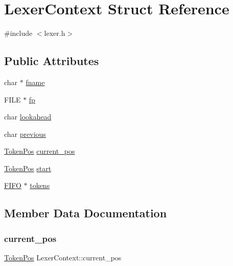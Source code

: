 \hypertarget{structLexerContext}{}\section{Lexer\+Context Struct Reference}
\label{structLexerContext}


{\ttfamily \#include $<$lexer.\+h$>$}

\subsection*{Public Attributes}
\begin{DoxyCompactItemize}
\item 
char $\ast$ \hyperlink{structLexerContext_ab941745e3601269ab7d72da361698c95}{fname}
\item 
F\+I\+LE $\ast$ \hyperlink{structLexerContext_affeb57f0be059a0acc030f3083f96391}{fp}
\item 
char \hyperlink{structLexerContext_a14dcc7ebe45bd949d90c3ca0ec633190}{lookahead}
\item 
char \hyperlink{structLexerContext_a7055e84bf6b73b013309a897b3e81861}{previous}
\item 
\hyperlink{structTokenPos}{Token\+Pos} \hyperlink{structLexerContext_a2b63768847414a6bd0f0039b77378e63}{current\+\_\+pos}
\item 
\hyperlink{structTokenPos}{Token\+Pos} \hyperlink{structLexerContext_ae1ea5952dcd546b0a1d445d2b3900765}{start}
\item 
\hyperlink{structFIFO}{F\+I\+FO} $\ast$ \hyperlink{structLexerContext_ad11164365dd9f5e321acc076b6445f0f}{tokens}
\end{DoxyCompactItemize}


\subsection{Member Data Documentation}
\hypertarget{structLexerContext_a2b63768847414a6bd0f0039b77378e63}{}\label{structLexerContext_a2b63768847414a6bd0f0039b77378e63} 
\subsubsection{\texorpdfstring{current\+\_\+pos}{current\_pos}}
{\footnotesize\ttfamily \hyperlink{structTokenPos}{Token\+Pos} Lexer\+Context\+::current\+\_\+pos}

